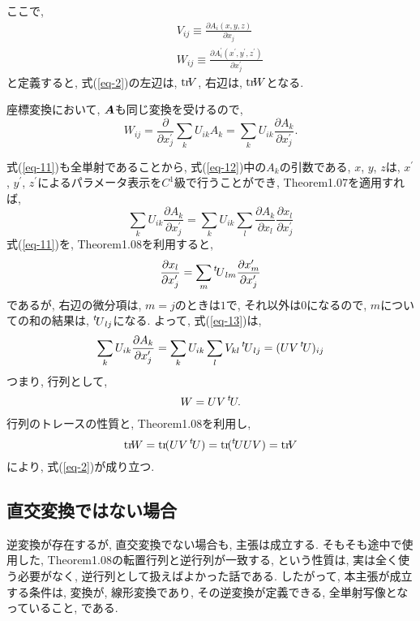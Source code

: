 \documentclass{jsarticle}
\newcommand*{\mbold}[1]{\mbox{\boldmath $#1$}}
\newcommand*{\transp}[1]{\prescript{t\!}{}{#1}}
\newcommand*{\trace}[1]{{\rm tr}\!{#1}}
\begin{document}
ここで, 
\begin{subequations}
  \begin{eqnarray}
    && V_{ij} \equiv \frac{\partial A_i(x, y, z)}{\partial x_j} \\
    && W_{ij} \equiv \frac{\partial A^\prime_i(x^\prime, y^\prime, z^\prime)}{\partial x^\prime_j}
  \end{eqnarray}
\end{subequations}
と定義すると, 
式(\ref{eq-2})の左辺は, $\trace{V}$, 右辺は, $\trace{W}$となる. 

座標変換において, $\mbold{A}$も同じ変換を受けるので, 
\begin{equation}\label{eq-12}
  W_{ij} = \frac{\partial}{\partial x^\prime_j}\sum_k U_{ik}A_k
  = \sum_k U_{ik}\frac{\partial A_k}{\partial x^\prime_j}.
\end{equation}

式(\ref{eq-11})も全単射であることから, 式(\ref{eq-12})中の$A_k$の引数である, $x$, $y$, $z$は, $x^\prime$, $y^\prime$, $z^\prime$によるパラメータ表示を$C^1$級で行うことができ, 
Theorem1.07を適用すれば, 
\begin{equation}\label{eq-13}
  \sum_k U_{ik}\frac{\partial A_k}{\partial x^\prime_j}
  = \sum_k U_{ik} \sum_l \frac{\partial A_k}{\partial x_l}\frac{\partial x_l}{\partial x^\prime_j}
\end{equation} 
式(\ref{eq-11})を, Theorem1.08を利用すると, 
\begin{equation}
  \frac{\partial x_l}{\partial x^\prime_j} = \sum_m \transp{U}_{lm}\frac{\partial x^\prime_m}{\partial x^\prime_j}
\end{equation}
であるが, 右辺の微分項は, $m = j$のときは$1$で, それ以外は$0$になるので, $m$についての和の結果は, $\transp{U}_{lj}$になる. 
よって, 式(\ref{eq-13})は, 
\begin{equation}
  \sum_k U_{ik} \frac{\partial A_k}{\partial x^\prime_j} 
  = \sum_k U_{ik} \sum_l V_{kl} \transp{U}_{lj}
  = (U V \transp{U})_{ij}
\end{equation}
つまり, 行列として, 
\begin{equation}
  W = UV\transp{U}.
\end{equation}
行列のトレースの性質と, Theorem1.08を利用し, 
\begin{equation}
  \trace{W} = \trace{(UV\transp{U})} = \trace{(\transp{U} UV)} = \trace{V}
\end{equation}
により, 式(\ref{eq-2})が成り立つ. 

\subsection{直交変換ではない場合}
逆変換が存在するが, 直交変換でない場合も, 主張は成立する. 
そもそも途中で使用した, Theorem1.08の転置行列と逆行列が一致する, という性質は, 実は全く使う必要がなく, 逆行列として扱えばよかった話である. 
したがって, 本主張が成立する条件は, 変換が, 線形変換であり, その逆変換が定義できる, 全単射写像となっていること, である. 
\end{document}
